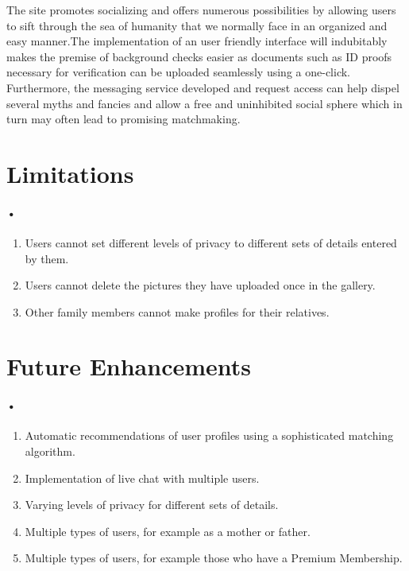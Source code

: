 \documentclass[12pt]{report}
\begin{document}
The site promotes socializing and offers numerous possibilities by allowing users to sift through the sea of humanity that we normally face in an organized and easy manner.The implementation of an user friendly interface will indubitably makes the premise of background checks easier as documents such as ID proofs necessary for verification can be uploaded seamlessly using a one-click.\\


Furthermore, the messaging service developed and request access can help dispel several myths and fancies and allow a free and uninhibited social sphere which in turn may often lead to promising matchmaking.


\section{Limitations}
\paragraph*{•}
 
\begin{enumerate}
\item Users cannot set different levels of privacy to different sets of details entered by them. 
\item Users cannot delete the pictures they have uploaded once in the gallery. 
\item Other family members cannot make profiles for their relatives.
\end{enumerate}


\section{Future Enhancements}
\paragraph*{•}
 
\begin{enumerate}
\item Automatic recommendations of user profiles using a sophisticated matching algorithm.  
\item Implementation of live chat with multiple users.
\item Varying levels of privacy for different sets of details.
\item Multiple types of users, for example as a mother or father.
\item Multiple types of users, for example those who have a Premium Membership. 

\end{enumerate}
\end{document}
